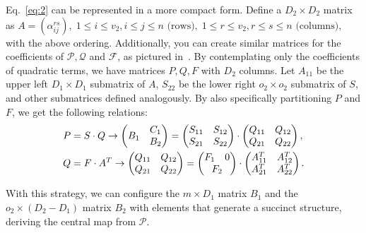 \documentclass[a4paper, 14pt]{extarticle}
\begin{document}
Eq.~\ref{eq:2} can be represented in a more compact form. Define a $D_{2} \times D_{2}$ matrix as
$
    A = (\alpha_{ij}^{rs}),\; 1 \leq i \leq v_{2}, i \leq j \leq n \text{ (rows)},\; 1 \leq r \leq v_{2}, r \leq s \leq n \text{ (columns)},
$
with the above ordering. Additionally, you can create similar matrices for the coefficients of $\mathcal{P}, \mathcal{Q}$ and $\mathcal{F}$, as pictured in~\cite[Figure 7.5]{Petzoldt:phd:2013:jul}. By contemplating only the coefficients of quadratic terms, we have matrices $P, Q, F$ with $D_{2}$ columns. Let $A_{11}$ be the upper left $D_{1} \times D_{1}$ submatrix of $A$, $S_{22}$ be the lower right $o_{2} \times o_{2}$ submatrix of $S$, and other submatrices defined analogously. By also specifically partitioning $P$ and $F$, we get the following relations:
\begin{align}\label{eq:3}
    P &= S \cdot Q \rightarrow
    \begin{pmatrix}
        B_{1} & \begin{matrix} C_{1} \\ B_{2} \end{matrix} \\
    \end{pmatrix} =
    \begin{pmatrix}
        S_{11} & S_{12} \\
        S_{21} & S_{22}
    \end{pmatrix} \cdot
    \begin{pmatrix}
        Q_{11} & Q_{12} \\
        Q_{21} & Q_{22}
    \end{pmatrix}, \\
    \label{eq:4}
    Q &= F \cdot A^{T} \rightarrow
    \begin{pmatrix}
        Q_{11} & Q_{12} \\
        Q_{21} & Q_{22}
    \end{pmatrix} =
    \begin{pmatrix}
        F_{1} & 0 \\
        \multicolumn{2}{c}{F_{2}}
    \end{pmatrix} \cdot
    \begin{pmatrix}
        A_{11}^{T} & A_{12}^{T} \\
        A_{21}^{T} & A_{22}^{T}
    \end{pmatrix}.
\end{align}

With this strategy, we can configure the $m \times D_{1}$ matrix $B_{1}$ and the $o_{2} \times (D_{2} - D_{1})$ matrix $B_{2}$ with elements that generate a succinct structure, deriving the central map from $\mathcal{P}$.
\end{document}
